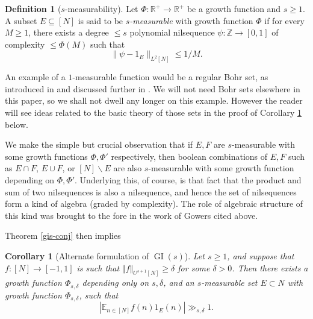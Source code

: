 \documentclass[11pt,reqno]{amsart}
\numberwithin{equation}{section}
\theoremstyle{plain}
\newtheorem{corollary}[subsection]{Corollary}
\theoremstyle{definition}
\newtheorem{definition}[subsection]{Definition}
\renewcommand{\leq}{\leqslant}
\renewcommand{\geq}{\geqslant}
\newcommand\E{{\mathbb{E}}}
\newcommand\Z{\mathbb{Z}}
\newcommand\R{\mathbb{R}}
\newcommand\1{{\bf 1}}
\newcommand\2{{\bf 2}}
\newcommand\GI{\operatorname{GI}}
\begin{document}
\begin{definition}[$s$-measurability]\label{s-meas-def}  Let $\Phi: \R^+ \to \R^+$ be a growth function and $s \geq 1$.  A subset $E \subseteq [N]$ is said to be \emph{$s$-measurable} with growth function $\Phi$ if for every $M \geq 1$, there exists a degree $\leq s$ polynomial nilsequence $\psi: \Z \to [0,1]$ of complexity $\leq \Phi(M)$ such that
$$ \| \psi - 1_E \|_{L^2[N]} \leq 1/M.$$
\end{definition}

An example of a $1$-measurable function would be a regular Bohr set, as introduced in \cite{bourgain-triples} and discussed further in \cite[\S 2]{green-tao-u3inverse}. We will not need Bohr sets elsewhere in this paper, so we shall not dwell any longer on this example. However the reader will see ideas related to the basic theory of those sets in the proof of Corollary \ref{corda} below.

We make the simple but crucial observation that if $E, F$ are $s$-measurable with some growth functions $\Phi, \Phi'$ respectively, then boolean combinations of $E, F$ such as $E \cap F$, $E \cup F$, or $[N] \backslash E$ are also $s$-measurable with some growth function depending on $\Phi,\Phi'$. Underlying this, of course, is that fact that the product and sum of two nilsequences is also a nilsequence, and hence the set of nilsequences form a kind of algebra (graded by complexity). The role of algebraic structure of this kind was brought to the fore in the work of Gowers \cite{gowers-regularity} cited above.

Theorem \ref{gis-conj} then implies

\begin{corollary}[Alternate formulation of $\GI(s)$]\label{corda} Let $s \geq 1$, and suppose that $f : [N] \rightarrow [-1,1]$ is such that $\Vert f \Vert_{U^{s+1}[N]} \geq \delta$ for some $\delta>0$.   Then there exists a growth function $\Phi_{s,\delta}$ depending only on $s,\delta$, and an $s$-measurable set $E \subset N$ with growth function $\Phi_{s,\delta}$, such that
$$ |\E_{n \in [N]} f(n) 1_E(n)| \gg_{s,\delta} 1.$$
\end{corollary}
\end{document}
